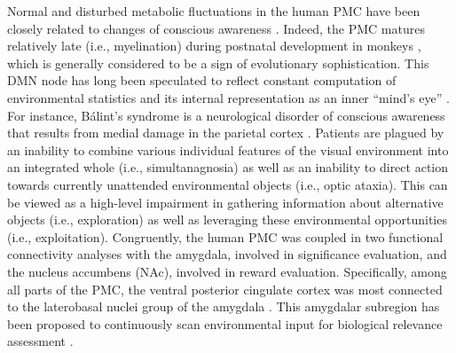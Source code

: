 \documentclass[10pt,letterpaper]{article}
\begin{document}
Normal and disturbed metabolic fluctuations in the
human PMC have been closely related to
changes of conscious awareness \citep{cavanna2006precuneus}.
Indeed,
the PMC matures relatively late (i.e., myelination) during postnatal development in monkeys
\citep{goldman1987development}, which is generally considered to
be a sign of evolutionary sophistication.
%
This DMN node has long been speculated to
reflect constant computation of
environmental statistics and its internal representation
as an inner ``mind's eye'' \citep{cavanna2006precuneus, leech_pcc2014}.
For instance, B\'alint's syndrome is a neurological disorder of conscious
awareness that results from medial damage in the parietal cortex
\citep{balint1909seelenlahmung}.
Patients are plagued by an
inability to combine various individual features of the visual
environment into an integrated whole (i.e., simultanagnosia)
as well as an inability to direct action towards
currently unattended environmental objects
(i.e., optic ataxia).
This can be viewed as a high-level impairment in gathering
information about alternative objects (i.e., exploration) as well as
leveraging these environmental opportunities (i.e., exploitation).
Congruently,
the human PMC was coupled in two functional connectivity analyses
\citep{bzdok2015subspecialization}
with the amygdala, involved in significance evaluation, and
the nucleus accumbens (NAc), involved in reward evaluation.
Specifically, among all parts of the PMC,
the ventral posterior cingulate cortex was
most connected to the laterobasal
nuclei group of the amygdala
\citep{bzdok2015subspecialization}.
This amygdalar subregion has been proposed to
continuously scan environmental input
for biological relevance assessment
\citep{amygdala_bzdok}.
\end{document}
